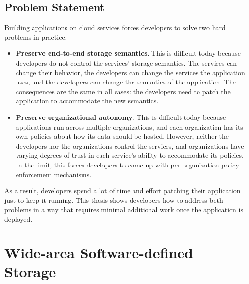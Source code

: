\subsection{Problem Statement}

Building applications on cloud services forces developers to solve two hard
problems in practice.

\begin{itemize}
   \item \textbf{Preserve end-to-end storage semantics}.  This is difficult
      today because developers do not
      control the services' storage semantics.  The services can change their
      behavior, the developers can change the services the application uses, and
      the developers can change the semantics of the application.
      The consequences are the same in all cases:  the developers need to patch the application to
      accommodate the new semantics.

   \item \textbf{Preserve organizational autonomy}.  This is difficult today
      because applications run across multiple organizations,
      and each organization has its own policies about how
      its data should be hosted.  However, neither the developers nor the organizations
      control the services, and organizations have varying degrees of trust in
      each service's ability to accommodate its policies.
      In the limit, this forces developers to come up with
      per-organization policy enforcement mechanisms.
\end{itemize}

As a result, developers spend a lot of time and effort patching their
application just to keep it running.  This thesis shows developers how to
address both problems in a way that requires minimal additional work once the
application is deployed.

\section{Wide-area Software-defined Storage}

